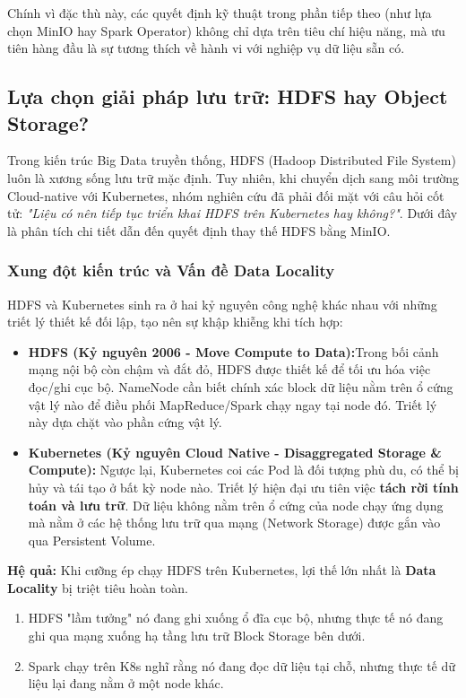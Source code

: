 Chính vì đặc thù này, các quyết định kỹ thuật trong phần tiếp theo (như lựa chọn MinIO hay Spark Operator) không chỉ dựa trên tiêu chí hiệu năng, mà ưu tiên hàng đầu là sự tương thích về hành vi với nghiệp vụ dữ liệu sẵn có.

\subsection{Lựa chọn giải pháp lưu trữ: HDFS hay Object Storage?}
Trong kiến trúc Big Data truyền thống, HDFS (Hadoop Distributed File System) luôn là xương sống lưu trữ mặc định. Tuy nhiên, khi chuyển dịch sang môi trường Cloud-native với Kubernetes, nhóm nghiên cứu đã phải đối mặt với câu hỏi cốt tử: \textit{"Liệu có nên tiếp tục triển khai HDFS trên Kubernetes hay không?"}. Dưới đây là phân tích chi tiết dẫn đến quyết định thay thế HDFS bằng MinIO.

\subsubsection{Xung đột kiến trúc và Vấn đề Data Locality}
HDFS và Kubernetes sinh ra ở hai kỷ nguyên công nghệ khác nhau với những triết lý thiết kế đối lập, tạo nên sự khập khiễng khi tích hợp:

\begin{itemize}
    \item \textbf{HDFS (Kỷ nguyên 2006 - Move Compute to Data):}Trong bối cảnh mạng nội bộ còn chậm và đắt đỏ, HDFS được thiết kế để tối ưu hóa việc đọc/ghi cục bộ. NameNode cần biết chính xác block dữ liệu nằm trên ổ cứng vật lý nào để điều phối MapReduce/Spark chạy ngay tại node đó. Triết lý này dựa chặt vào phần cứng vật lý.
    \item \textbf{Kubernetes (Kỷ nguyên Cloud Native - Disaggregated Storage \& Compute):} Ngược lại, Kubernetes coi các Pod là đối tượng phù du, có thể bị hủy và tái tạo ở bất kỳ node nào. Triết lý hiện đại ưu tiên việc \textbf{tách rời tính toán và lưu trữ}. Dữ liệu không nằm trên ổ cứng của node chạy ứng dụng mà nằm ở các hệ thống lưu trữ qua mạng (Network Storage) được gắn vào qua Persistent Volume.
\end{itemize}

\textbf{Hệ quả:} Khi cưỡng ép chạy HDFS trên Kubernetes, lợi thế lớn nhất là \textbf{Data Locality} bị triệt tiêu hoàn toàn.

\begin{enumerate}
    \item HDFS "lầm tưởng" nó đang ghi xuống ổ đĩa cục bộ, nhưng thực tế nó đang ghi qua mạng xuống hạ tầng lưu trữ Block Storage bên dưới.
    \item Spark chạy trên K8s nghĩ rằng nó đang đọc dữ liệu tại chỗ, nhưng thực tế dữ liệu lại đang nằm ở một node khác.
\end{enumerate}


